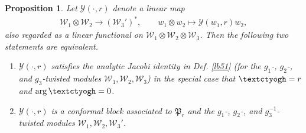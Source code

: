 \documentclass[11pt,b5paper,notitlepage]{article}
\theoremstyle{definition}
\theoremstyle{plain}
\newtheorem{pp}[df]{Proposition}
\newcommand{\fk}{\mathfrak}
\newcommand{\mc}{\mathcal}
\newcommand{\tipaz}{\text{\textctyogh}}
\numberwithin{equation}{subsection}
\begin{document}
\begin{pp}\label{lb54}
Let $\mc Y(\cdot,r)$ denote a linear map
\begin{gather*}
\mc W_1\otimes \mc W_2\rightarrow (\mc W_3')^*,\qquad w_1\otimes w_2\mapsto\mc Y(w_1,r)w_2,	
\end{gather*}
also regarded as a linear functional on $\mc W_1\otimes\mc W_2\otimes \mc W_3$. Then the following two statements are equivalent.
\begin{enumerate}[label=(\alph*)]
\item $\mc Y(\cdot,r)$ satisfies the analytic Jacobi identity in Def. \ref{lb51} (for the $g_1$-, $g_2$-, and $g_3$-twisted modules $\mc W_1,\mc W_2,\mc W_3$) in the special case that $\tipaz=r$ and $\arg\tipaz=0$.	
\item $\mc Y(\cdot,r)$ is a conformal block associated to $\fk P_r$ and the $g_1$-, $g_2$-, and $g_3^{-1}$-twisted modules $\mc W_1,\mc W_2,\mc W_3'$.
\end{enumerate}	
\end{pp}
\end{document}
